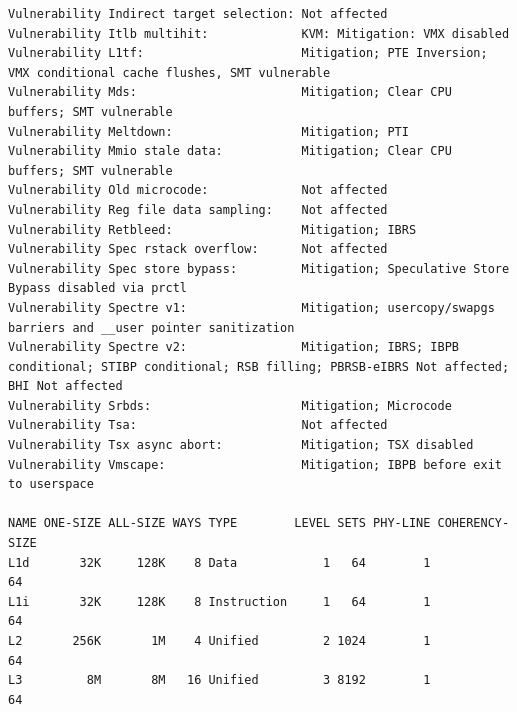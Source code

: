 \begin{lstlisting}[caption={Ausagbe von lscpu und lscpu --caches des
Intel\textregistered\space Core\texttrademark\space i7-6700K}]
Vulnerability Indirect target selection: Not affected
Vulnerability Itlb multihit:             KVM: Mitigation: VMX disabled
Vulnerability L1tf:                      Mitigation; PTE Inversion; VMX conditional cache flushes, SMT vulnerable
Vulnerability Mds:                       Mitigation; Clear CPU buffers; SMT vulnerable
Vulnerability Meltdown:                  Mitigation; PTI
Vulnerability Mmio stale data:           Mitigation; Clear CPU buffers; SMT vulnerable
Vulnerability Old microcode:             Not affected
Vulnerability Reg file data sampling:    Not affected
Vulnerability Retbleed:                  Mitigation; IBRS
Vulnerability Spec rstack overflow:      Not affected
Vulnerability Spec store bypass:         Mitigation; Speculative Store Bypass disabled via prctl
Vulnerability Spectre v1:                Mitigation; usercopy/swapgs barriers and __user pointer sanitization
Vulnerability Spectre v2:                Mitigation; IBRS; IBPB conditional; STIBP conditional; RSB filling; PBRSB-eIBRS Not affected; BHI Not affected
Vulnerability Srbds:                     Mitigation; Microcode
Vulnerability Tsa:                       Not affected
Vulnerability Tsx async abort:           Mitigation; TSX disabled
Vulnerability Vmscape:                   Mitigation; IBPB before exit to userspace

NAME ONE-SIZE ALL-SIZE WAYS TYPE        LEVEL SETS PHY-LINE COHERENCY-SIZE
L1d       32K     128K    8 Data            1   64        1             64
L1i       32K     128K    8 Instruction     1   64        1             64
L2       256K       1M    4 Unified         2 1024        1             64
L3         8M       8M   16 Unified         3 8192        1             64
\end{lstlisting}

